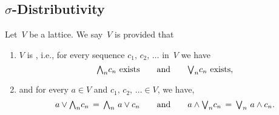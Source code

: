 \documentclass[main.tex]{subfiles}
\begin{document}
\subsection{$\sigma$-Distributivity}
\label{SS:sigma-distributive}
%
% 
\begin{dfn}
\label{D:sigma-distributive}
Let~$V$ be a lattice.
We say~$V$ is
provided that
\begin{enumerate}
\item
$V$ is , i.e.,
for every sequence $c_1,\,c_2,\,\dotsc$ in~$V$
we have 
\begin{equation*}
\text{ $\textstyle{\bigwedge}_n c_n$ exists\qquad and\qquad $\textstyle{\bigvee}_n c_n$ exists, }
\end{equation*}
\item
and for every  $a\in V$ and $c_1,\,c_2,\,\dotsc\in V$,
we have,
\begin{equation*}
a \vee \textstyle{\bigwedge}_n c_n \,=\, \textstyle{\bigwedge}_n\  a\vee c_n
\qquad\text{and}\qquad
a \wedge \textstyle{\bigvee}_n c_n \,=\, \textstyle{\bigvee}_n\  a\wedge c_n.
\end{equation*}
\end{enumerate}
\end{dfn}
\end{document}
